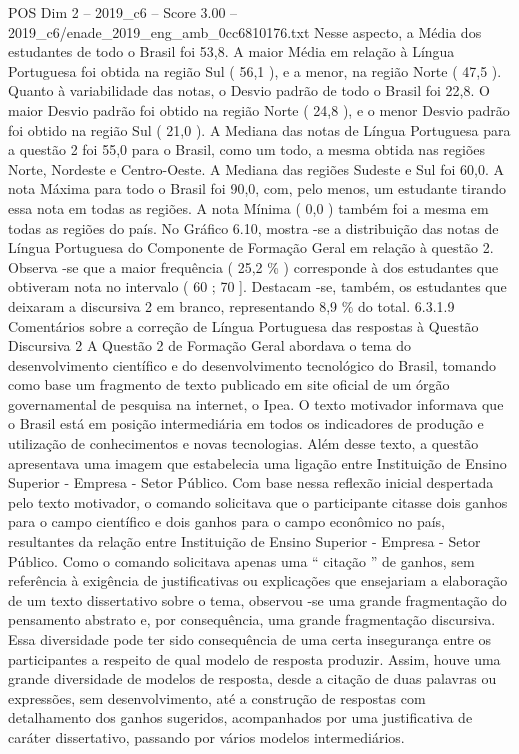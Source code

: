\begin{textsample}{POS Dim 2 – 2019\_c6 – Score 3.00 – 2019\_c6/enade\_2019\_eng\_amb\_0cc6810176.txt}
Nesse aspecto, a Média dos estudantes de todo o Brasil foi 53,8.
A maior Média em relação à Língua Portuguesa foi obtida na região Sul ( 56,1 ), e a menor, na região Norte ( 47,5 ).
Quanto à variabilidade das notas, o Desvio padrão de todo o Brasil foi 22,8.
O maior Desvio padrão foi obtido na região Norte ( 24,8 ), e o menor Desvio padrão foi obtido na região Sul ( 21,0 ).
A Mediana das notas de Língua Portuguesa para a questão 2 foi 55,0 para o Brasil, como um todo, a mesma obtida nas regiões Norte, Nordeste e Centro-Oeste.
A Mediana das regiões Sudeste e Sul foi 60,0.
A nota Máxima para todo o Brasil foi 90,0, com, pelo menos, um estudante tirando essa nota em todas as regiões.
A nota Mínima ( 0,0 ) também foi a mesma em todas as regiões do país.
No Gráfico 6.10, mostra -se a distribuição das notas de Língua Portuguesa do Componente de Formação Geral em relação à questão 2.
Observa -se que a maior frequência ( 25,2 \% ) corresponde à dos estudantes que obtiveram nota no intervalo ( 60 ; 70 ].
Destacam -se, também, os estudantes que deixaram a discursiva 2 em branco, representando 8,9 \% do total. 6.3.1.9 Comentários sobre a correção de Língua Portuguesa das respostas à Questão Discursiva 2 A Questão 2 de Formação Geral abordava o tema do desenvolvimento científico e do desenvolvimento tecnológico do Brasil, tomando como base um fragmento de texto publicado em site oficial de um órgão governamental de pesquisa na internet, o Ipea.
O texto motivador informava que o Brasil está em posição intermediária em todos os indicadores de produção e utilização de conhecimentos e novas tecnologias.
Além desse texto, a questão apresentava uma imagem que estabelecia uma ligação entre Instituição de Ensino Superior - Empresa - Setor Público.
Com base nessa reflexão inicial despertada pelo texto motivador, o comando solicitava que o participante citasse dois ganhos para o campo científico e dois ganhos para o campo econômico no país, resultantes da relação entre Instituição de Ensino Superior - Empresa - Setor Público.
Como o comando solicitava apenas uma “ citação ” de ganhos, sem referência à exigência de justificativas ou explicações que ensejariam a elaboração de um texto dissertativo sobre o tema, observou -se uma grande fragmentação do pensamento abstrato e, por consequência, uma grande fragmentação discursiva.
Essa diversidade pode ter sido consequência de uma certa insegurança entre os participantes a respeito de qual modelo de resposta produzir.
Assim, houve uma grande diversidade de modelos de resposta, desde a citação de duas palavras ou expressões, sem desenvolvimento, até a construção de respostas com detalhamento dos ganhos sugeridos, acompanhados por uma justificativa de caráter dissertativo, passando por vários modelos intermediários.

\end{textsample}
